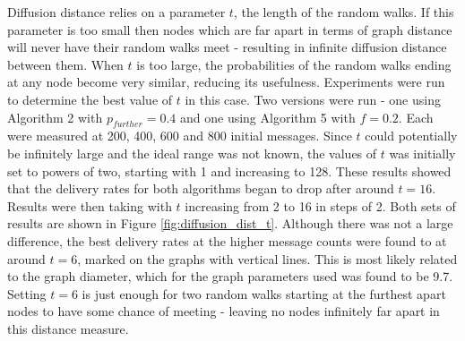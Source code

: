 \documentclass[bsc,frontabs,twoside,singlespacing,parskip,deptreport]{infthesis}     %
\begin{document}
Diffusion distance relies on a parameter $t$, the length of the random walks. If this parameter is too small then nodes which are far apart in terms of graph distance will never have their random walks meet - resulting in infinite diffusion distance between them. When $t$ is too large, the probabilities of the random walks ending at any node become very similar, reducing its usefulness. Experiments were run to determine the best value of $t$ in this case. Two versions were run - one using Algorithm 2 with $p_{further}=0.4$ and one using Algorithm 5 with $f=0.2$. Each were measured at 200, 400, 600 and 800 initial messages. Since $t$ could potentially be infinitely large and the ideal range was not known, the values of $t$ was initially set to powers of two, starting with 1 and increasing to 128. These results showed that the delivery rates for both algorithms began to drop after around $t=16$. Results were then taking with $t$ increasing from 2 to 16 in steps of 2. Both sets of results are shown in Figure \ref{fig:diffusion_dist_t}. Although there was not a large difference, the best delivery rates at the higher message counts were found to at around $t=6$, marked on the graphs with vertical lines. This is most likely related to the graph diameter, which for the graph parameters used was found to be 9.7. Setting $t=6$ is just enough for two random walks starting at the furthest apart nodes to have some chance of meeting - leaving no nodes infinitely far apart in this distance measure.
\end{document}
